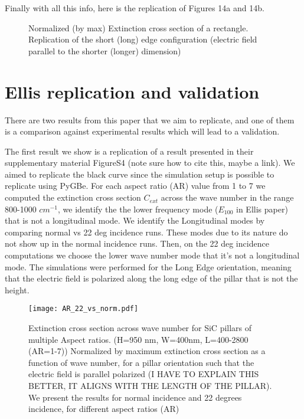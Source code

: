  Finally with all this info, here is the replication of Figures 14a and 14b. 

 \begin{figure}
    \centering

    \caption{Normalized (by max) Extinction cross section of a rectangle. Replication of 
    the short (long) edge configuration (electric field parallel to the shorter (longer) dimension)}
    \label{fig:rep_14}
 \end{figure}


 \section{Ellis replication and validation}

There are two results from this paper that we aim to replicate, and one of them is a comparison
against experimental results which will lead to a validation. 

The first result we show is a replication of a result presented in their supplementary 
material FigureS4 {\color{red}(note sure how to cite this, maybe a link)}. We aimed to replicate the 
black curve since the simulation setup is possible to replicate using PyGBe. For each aspect ratio (AR) 
value from 1 to 7 we computed the extinction cross section $C_{ext}$ across the wave number in the range
800-1000 $cm^{-1}$, we identify the the lower frequency mode ($E_{100}$ in Ellis paper)  that is not a 
longitudinal mode. We identify the Longitudinal modes by comparing normal vs 22 deg incidence runs. These
modes due to its nature do not show up in the normal incidence runs. Then, on the 22 deg incidence 
computations we choose the lower wave number mode that it's not a longitudinal mode. The simulations were 
performed for the Long Edge orientation, meaning that the electric field is polarized along the long edge 
of the pillar that is not the height. 

\begin{figure}
    \centering
    \texttt{[image: AR\_22\_vs\_norm.pdf]} 
    \caption{ Extinction cross section across wave number for SiC pillars of multiple Aspect ratios. 
             (H=950 nm, W=400nm, L=400-2800 (AR=1-7))
            Normalized by maximum extinction cross section as a function of wave number,
            for a pillar orientation such that the electric field is parallel polarized 
            (I HAVE TO EXPLAIN THIS BETTER, IT ALIGNS WITH THE LENGTH OF THE PILLAR). 
            We present the results for normal incidence and 22 degrees incidence, 
            for different aspect ratios (AR)
            }
    \label{fig:AR_22_vs_norm}
 \end{figure}


